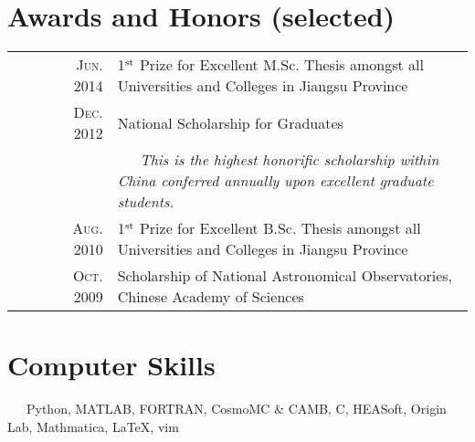 \documentclass[10pt]{article}
\begin{document}
\section{Awards and Honors (selected)}
\begin{tabular}{rl}
~~~~~~\textsc{Jun. 2014} & 1$^{\rm st}$ Prize for Excellent M.Sc. Thesis amongst all Universities and Colleges in Jiangsu Province   \\
~~~~~~\textsc{Dec. 2012} & National Scholarship for Graduates \\
& {\it\small ~~~This is the highest honorific scholarship within China conferred annually upon excellent graduate students.}\\
~~~~~~\textsc{Aug. 2010} & 1$^{\rm st}$ Prize for Excellent B.Sc. Thesis amongst all Universities and Colleges in Jiangsu Province   \\
~~~~~~\textsc{Oct. 2009} & Scholarship of National Astronomical Observatories, Chinese Academy of Sciences    \\
\end{tabular}

\section{Computer Skills}
~~~Python, MATLAB, FORTRAN, CosmoMC \& CAMB, C, HEASoft, Origin Lab, Mathmatica, \LaTeX, vim

\end{document}
